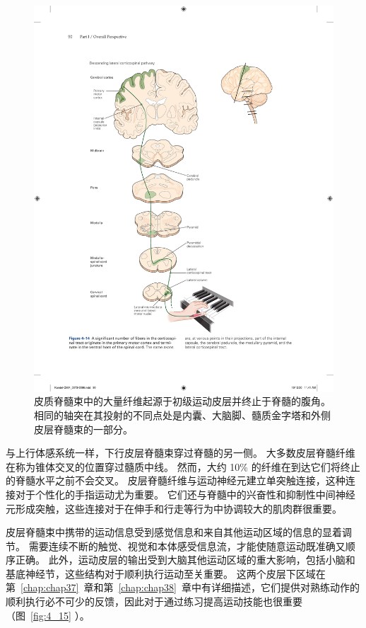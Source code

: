 \begin{figure}[htbp]
	\centering
	\includegraphics[width=1.0\linewidth]{chap04/fig_4_14}
	\caption{皮质脊髓束中的大量纤维起源于初级运动皮层并终止于脊髓的腹角。
		相同的轴突在其投射的不同点处是内囊、大脑脚、髓质金字塔和外侧皮层脊髓束的一部分。}
	\label{fig:4_14}
\end{figure}


与上行体感系统一样，下行皮层脊髓束穿过脊髓的另一侧。 
大多数皮层脊髓纤维在称为锥体交叉的位置穿过髓质中线。 
然而，大约 10\% 的纤维在到达它们将终止的脊髓水平之前不会交叉。 
皮层脊髓纤维与运动神经元建立单突触连接，这种连接对于个性化的手指运动尤为重要。 
它们还与脊髓中的兴奋性和抑制性中间神经元形成突触，这些连接对于在伸手和行走等行为中协调较大的肌肉群很重要。


皮层脊髓束中携带的运动信息受到感觉信息和来自其他运动区域的信息的显着调节。 
需要连续不断的触觉、视觉和本体感受信息流，才能使随意运动既准确又顺序正确。 
此外，运动皮层的输出受到大脑其他运动区域的重大影响，包括小脑和基底神经节，这些结构对于顺利执行运动至关重要。 
这两个皮层下区域在第~\ref{chap:chap37}~章和第~\ref{chap:chap38}~章中有详细描述，它们提供对熟练动作的顺利执行必不可少的反馈，因此对于通过练习提高运动技能也很重要（图~\ref{fig:4_15} ）。

